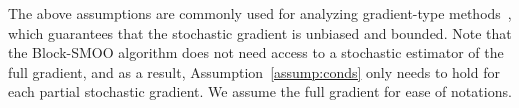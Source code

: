 \documentclass[11pt,a4paper]{article}
\numberwithin{equation}{section}%
\newtheorem{definition}{Definition}
\renewcommand{\(}{\left (}
\renewcommand{\)}{\right )}
\newcommand{\Fm}{F_m}
\begin{document}
The above assumptions are commonly used for analyzing gradient-type methods~\cite{LBottou_FECurtis_JNocedal_2018,shalev2007pegasos,recht2011hogwild,nemirovski2009robust}, which guarantees that the stochastic gradient is unbiased and bounded. Note that the Block-SMOO algorithm does not need access to a stochastic estimator of the full gradient, and as a result, Assumption~\ref{assump:conds} only needs to hold for each partial stochastic gradient. We assume the full gradient for ease of notations. 

\end{document}
